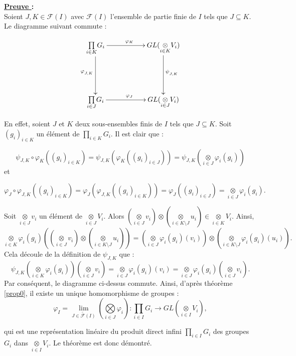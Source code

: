 \documentclass[a4paper, 14pt]{report}
\begin{document}
\begin{onehalfspace}
{			
			\textbf{\underline{Preuve }  :}\\ 
			Soient \( J , K \in \mathcal{F}(I) \) avec $\mathcal{F}(I)$ l'ensemble de partie finie de \( I \) tels que \( J \subseteq K \). Le diagramme suivant commute :
			
			$$
			\xymatrix{
				\underset{i\in K} \prod G_i \ar@{->}[rr]^{\varphi_{K}} \ar@{->}[dd]_{\varphi_{_{J,K}}} && GL(\underset{i\in K} \otimes V_i) \ar@{->}[dd]^{\psi_{_{J,K}}} \\
				&& \\
				\underset{i\in J} \prod G_i \ar@{->}[rr]^{\varphi_{J}} && GL(\underset{i\in J} \otimes V_i)
			}
			$$
			
			En effet, soient \( J \) et \( K \) deux sous-ensembles finis de \( I \) tels que \( J \subseteq K \). Soit \( (g_i)_{i \in K} \) un élément de \( \underset{i\in K} \prod G_i \). Il est clair que :
			
			$$
			\psi_{J,K} \circ \varphi_{K} ((g_i)_{i\in K}) = \psi_{J, K}(\varphi_{K} ((g_i)_{i\in J})) = \psi_{J,K}(\underset{i\in J} \otimes \varphi_{i}(g_i))
			$$
			et
			
			$$
			\varphi_{J} \circ \varphi_{J,K} ((g_i)_{i\in K}) = \varphi_{J}(\varphi_{J,K}((g_i)_{i\in K})) = \varphi_{J} ((g_i)_{i\in J}) = \underset{i\in J} \otimes \varphi_{i}(g_i).
			$$
			
			Soit \( \underset{i\in J} \otimes v_i \) un élément de \( \underset{i\in J} \otimes V_i \). Alors \( (\underset{i\in J} \otimes v_i) \otimes (\underset{i\in K \setminus J} \otimes u_i) \in \underset{i\in K} \otimes V_i \). Ainsi,
			$$
			\underset{i\in K} \otimes \varphi_{i}(g_i) \left( (\underset{i\in J} \otimes v_i) \otimes (\underset{i\in K \setminus J} \otimes u_i) \right) = (\underset{i\in J} \otimes \varphi_{i}(g_i)(v_i)) \otimes (\underset{i\in K \setminus J} \otimes \varphi_{i}(g_i)(u_i)).
			$$
			Cela découle de la définition de \( \psi_{J,K} \) que :
			$$
			\psi_{J,K}(\underset{i\in K} \otimes \varphi_{i}(g_i))(\underset{i\in J} \otimes v_{i}) = \underset{i\in J} \otimes \varphi_{i}(g_i)(v_i) = \underset{i\in J} \otimes \varphi_{i}(g_i)(\underset{i\in J} \otimes v_i).
			$$
			Par conséquent, le diagramme ci-dessus commute. Ainsi, d'après théorème \ref{prop0}, il existe un unique homomorphisme de groupes :
			$$
			\varphi_I = 	\underset{\overleftarrow{J \in \mathcal{F}(I)}}{\lim} ( \underset{i \in J}{\bigotimes} \varphi_i) : \underset{i\in I} \prod G_i \longrightarrow GL(\underset{i\in I} \otimes V_i),
			$$
			
			qui est une représentation linéaire du produit direct infini \( \underset{i\in I} \prod G_i \) des groupes \( G_i \) dans \( \underset{i\in I} \otimes V_i \). Le théorème est donc démontré.
			
}
\end{onehalfspace}
\end{document}
